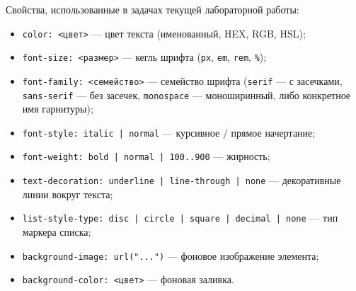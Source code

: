 Свойства, использованные в задачах текущей лабораторной работы:
\begin{itemize}
  \item \texttt{color: <цвет>} --- цвет текста (именованный,
        HEX, RGB, HSL);
  \item \texttt{font-size: <размер>} --- кегль шрифта
        (\texttt{px}, \texttt{em}, \texttt{rem}, \texttt{\%});
  \item \texttt{font-family: <семейство>} --- семейство шрифта
        (\texttt{serif} --- с засечками, \texttt{sans-serif} ---
        без засечек, \texttt{monospace} --- моноширинный,
        либо конкретное имя гарнитуры);
  \item \texttt{font-style: italic | normal} --- курсивное /
        прямое начертание;
  \item \texttt{font-weight: bold | normal | 100..900} ---
        жирность;
  \item \texttt{text-decoration: underline | line-through | none} ---
        декоративные линии вокруг текста;
  \item \texttt{list-style-type: disc | circle | square |
        decimal | none} --- тип маркера списка;
  \item \texttt{background-image: url("...")} --- фоновое
        изображение элемента;
  \item \texttt{background-color: <цвет>} --- фоновая заливка.
\end{itemize}

\endinput
